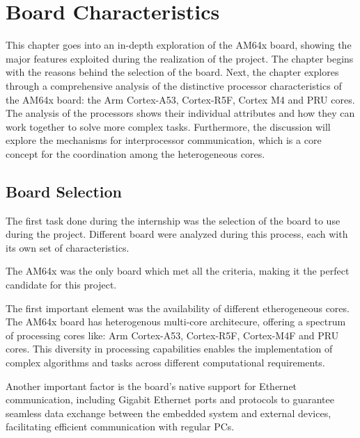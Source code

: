 

\chapter{Board Characteristics}

This chapter goes into an in-depth exploration of the AM64x board, showing the
major features exploited during the realization of the project.
The chapter begins with the reasons behind the selection of the board.
Next, the chapter explores through a comprehensive analysis of the
distinctive processor characteristics of the AM64x board: the Arm Cortex-A53,
Cortex-R5F, Cortex M4 and PRU cores. The analysis of the processors shows their
individual attributes and how they can work together to solve more complex
tasks.
Furthermore, the discussion will explore the mechanisms for interprocessor
communication, which is a core concept for the coordination among the
heterogeneous cores.

\section{Board Selection}

The first task done during the internship was the selection of the board to use
during the project.
Different board were analyzed during this process, each with its own set of
characteristics.

The AM64x was the only board which met all the criteria, making it the perfect
candidate for this project.

The first important element was the availability of different etherogeneous
cores. The AM64x board has heterogenous multi-core architecure, offering a
spectrum of processing cores like: Arm Cortex-A53, Cortex-R5F, Cortex-M4F and
PRU cores. This diversity in processing capabilities enables the implementation
of complex algorithms and tasks across different computational requirements.

Another important factor is the board's native support for Ethernet
communication, including Gigabit Ethernet ports and protocols to guarantee 
seamless data exchange between the embedded system and external devices,
facilitating efficient communication with regular PCs.

